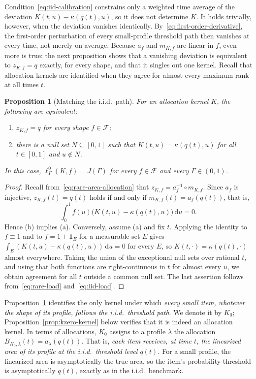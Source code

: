 \documentclass[11pt]{article}
\newtheorem{proposition}[theorem]{Proposition}
\theoremstyle{definition}
\theoremstyle{remark}
\newcommand{\dd}{\,\mathrm d}
\newcommand{\ind}{\mathbf 1}
\begin{document}
Condition~\eqref{eq:iid-calibration} constrains only a weighted time average of the deviation $K(t,u)-\kappa(q(t),u)$, so it does not determine $K$.
It holds trivially, however, when the deviation vanishes identically.
By~\eqref{eq:first-order-derivative}, the first-order perturbation of every small-profile threshold path then vanishes at every time, not merely on average.
Because $a_f$ and $m_{K,f}$ are linear in $f$, even more is true: the next proposition shows that a vanishing deviation is equivalent to $z_{K,f}=q$ exactly, for every shape, and that it singles out one kernel.
Recall that allocation kernels are identified when they agree
for almost every maximum rank at all times $t$.

\begin{proposition}[Matching the i.i.d.\ path]\label{prop:iid-path-kernel}
For an allocation kernel $K$, the following are equivalent:
\begin{enumerate}
\item[(a)] $z_{K,f}=q$ for every shape $f\in\mathcal F$;
\item[(b)] there is a null set $N\subseteq[0,1]$ such that $K(t,u)=\kappa(q(t),u)$ for all $t\in[0,1]$ and $u\notin N$.
\end{enumerate}
In this case, $\ell^{0}_\Gamma(K,f)=J(\Gamma)$ for every $f\in\mathcal F$ and every $\Gamma\in(0,1)$.
\end{proposition}

\begin{proof}
Recall from~\eqref{eq:rare-area-allocation} that
$z_{K,f}=a_f^{-1}\circ m_{K,f}$. Since $a_f$ is injective, $z_{K,f}(t)=q(t)$ holds if and only if $m_{K,f}(t)=a_f(q(t))$, that is,
\[
 \int_0^1f(u)\bigl(K(t,u)-\kappa(q(t),u)\bigr)\dd u=0.
\]
Hence (b) implies (a).
Conversely, assume (a) and fix $t$.
Applying the identity to $f\equiv1$ and to $f=1+\ind_E$ for a measurable set $E$ gives $\int_E(K(t,u)-\kappa(q(t),u))\dd u=0$ for every $E$, so $K(t,\cdot)=\kappa(q(t),\cdot)$ almost everywhere.
Taking the union of the exceptional null sets over rational $t$, and using that both functions are right-continuous in $t$ for almost every $u$, we obtain agreement for all $t$ outside a common null set.
The last assertion follows from~\eqref{eq:rare-load} and~\eqref{eq:iid-load}.
\end{proof}

Proposition~\ref{prop:iid-path-kernel} identifies the only kernel under which \emph{every small item, whatever the shape of its profile, follows the i.i.d.\ threshold path}.
We denote it by $K_0$; Proposition~\ref{prop:kzero-kernel} below verifies that it is indeed an allocation kernel.
In terms of allocations, $K_0$ assigns to a profile $\lambda$ the allocation $B_{K_0,\lambda}(t)=a_\lambda(q(t))$.
That is, \emph{each item receives, at time $t$, the linearized area of its profile at the i.i.d.\ threshold level $q(t)$.}
For a small profile, the linearized area is asymptotically the true area, so the item's probability threshold is asymptotically $q(t)$, exactly as in the i.i.d.\ benchmark.
\end{document}
